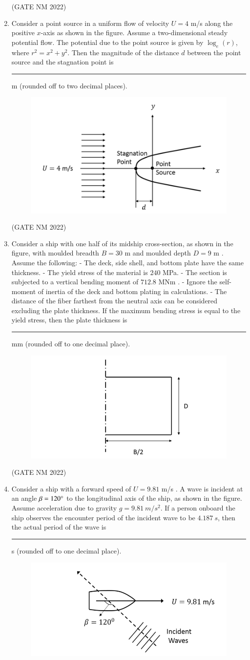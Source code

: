 \documentclass[journal,12pt,onecolumn]{IEEEtran}
\theoremstyle{remark}
\begin{document}
\begin{enumerate}
\hfill(GATE NM 2022)

\item Consider a point source in a uniform flow of velocity $U = 4$ m/s  along the positive $x$-axis as shown in the figure.  
Assume a two-dimensional steady potential flow.  
The potential due to the point source is given by $\log_e(r)$, where $r^2 = x^2 + y^2$.  
Then the magnitude of the distance $d$ between the point source and the stagnation point is  
\rule{3cm}{0.15mm} m  (rounded off to two decimal places).
\newpage
\begin{figure}[h]
	\centering
	\includegraphics[width=0.2\columnwidth]{fig15}
	\caption{}
	\label{fig:placeholder}
\end{figure}

\hfill(GATE NM 2022)

\item Consider a ship with one half of its midship cross-section, as shown in the figure,  
with moulded breadth $B = 30$ m  and moulded depth $D = 9$ m .  
Assume the following:  
- The deck, side shell, and bottom plate have the same thickness.  
- The yield stress of the material is $240$ MPa.  
- The section is subjected to a vertical bending moment of $712.8$ MNm .  
- Ignore the self-moment of inertia of the deck and bottom plating in calculations.  
- The distance of the fiber farthest from the neutral axis can be considered excluding the plate thickness.  
If the maximum bending stress is equal to the yield stress, then the plate thickness is  
\rule{3cm}{0.15mm}  mm (rounded off to one decimal place).
\begin{figure}[h]
	\centering
\includegraphics[width=0.3\columnwidth]{fig16}
	\caption{}
	\label{fig:placeholder}
\end{figure}

\hfill(GATE NM 2022)

\item Consider a ship  with a forward speed of  
$U = 9.81$ m/s . A wave is incident at an angle $\beta = 120\degree $  
to the longitudinal axis of the ship, as shown in the figure. Assume acceleration  
due to gravity $g = 9.81\ m/s^2 $.  
If a person onboard the ship observes the encounter period of the incident wave to be  
$4.187\ s $, then the actual period of the wave is  
\rule{3cm}{0.15mm}  s  (rounded off to one decimal place).
\begin{figure}[h]
	\centering
	\includegraphics[width=0.3\columnwidth]{fig17}
	\caption{}
	\label{fig:placeholder}
\end{figure}


\end{enumerate}
\end{document}
